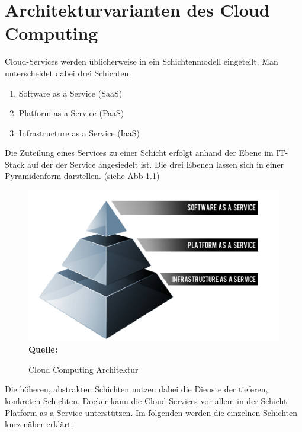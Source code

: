 \chapter{Architekturvarianten des Cloud Computing}
\label{cha:architekturvarianten_des_cloud_computing}
Cloud-Services werden üblicherweise in ein Schichtenmodell eingeteilt. Man unterscheidet dabei drei Schichten:
\begin{enumerate}
      \itemsep0pt
      \item Software as a Service (SaaS)\cite{microsoft_cloud_2014-1}
      \item Platform as a Service (PaaS)\cite{microsoft_cloud_2014-2}
      \item Infrastructure as a Service (IaaS)\cite{microsoft_cloud_2014}
\end{enumerate}
Die Zuteilung eines Services zu einer Schicht erfolgt anhand der Ebene im IT-Stack auf der der Service angesiedelt ist.
Die drei Ebenen lassen sich in einer Pyramidenform darstellen. (siehe Abb \ref{fig:iaas_paas_saas}) 

\begin{figure}[htb]
  \centering  
  \includegraphics[scale=0.7]{img/iaas_paas_saas.png}\\
  \footnotesize\sffamily\textbf{Quelle:} \cite{kepes_understanding_????}
  \caption{Cloud Computing Architektur}
  \label{fig:iaas_paas_saas}
\end{figure}

Die höheren, abstrakten Schichten nutzen dabei die Dienste der tieferen, konkreten Schichten.
Docker kann die Cloud-Services vor allem in der Schicht Platform as a Service unterstützen.
Im folgenden werden die einzelnen Schichten kurz näher erklärt.
